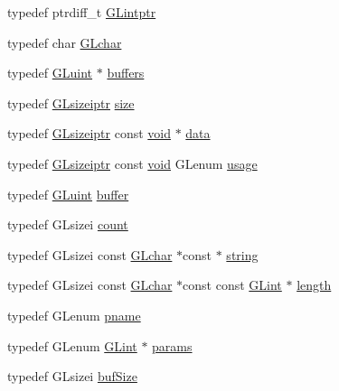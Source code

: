 \begin{DoxyCompactItemize}
\item 
typedef ptrdiff\+\_\+t \hyperlink{namespacetrimesh_a77e138abc0b5c76fc39e900b4ddc2242}{G\+Lintptr}
\item 
typedef char \hyperlink{namespacetrimesh_ae0c0512592dbcadf9b11efef0409d165}{G\+Lchar}
\item 
typedef \hyperlink{namespacetrimesh_ad2289423ef47b393854afc30451d433b}{G\+Luint} $\ast$ \hyperlink{namespacetrimesh_acc06e888c17b5866a5d0551277c1cc3e}{buffers}
\item 
typedef \hyperlink{namespacetrimesh_a81f1ae6b94117df73fad0a5577fd01a9}{G\+Lsizeiptr} \hyperlink{namespacetrimesh_a1c71e2912be63f694df9e9991bddb15e}{size}
\item 
typedef \hyperlink{namespacetrimesh_a81f1ae6b94117df73fad0a5577fd01a9}{G\+Lsizeiptr} const \hyperlink{namespacetrimesh_a784ddfd979e1c579bda795a8edfc3f43}{void} $\ast$ \hyperlink{namespacetrimesh_ad9c3b218c6c8bf976dbcd9afb8740bb8}{data}
\item 
typedef \hyperlink{namespacetrimesh_a81f1ae6b94117df73fad0a5577fd01a9}{G\+Lsizeiptr} const \hyperlink{namespacetrimesh_a784ddfd979e1c579bda795a8edfc3f43}{void} G\+Lenum \hyperlink{namespacetrimesh_a1ddaaba06600c3dc8f7557589161162f}{usage}
\item 
typedef \hyperlink{namespacetrimesh_ad2289423ef47b393854afc30451d433b}{G\+Luint} \hyperlink{namespacetrimesh_ae4f60945a9da75d2dbe2212bdfd63df1}{buffer}
\item 
typedef G\+Lsizei \hyperlink{namespacetrimesh_ac13d44425d3b59f77b5d7d2917514052}{count}
\item 
typedef G\+Lsizei const \hyperlink{namespacetrimesh_ae0c0512592dbcadf9b11efef0409d165}{G\+Lchar} $\ast$const  $\ast$ \hyperlink{namespacetrimesh_a51b4a31323874089623d4b17afabc1aa}{string}
\item 
typedef G\+Lsizei const \hyperlink{namespacetrimesh_ae0c0512592dbcadf9b11efef0409d165}{G\+Lchar} $\ast$const const \hyperlink{namespacetrimesh_aeccc290e30b317c861fb146956528187}{G\+Lint} $\ast$ \hyperlink{namespacetrimesh_ad67aebb2caf29002f1fc65745e7b790b}{length}
\item 
typedef G\+Lenum \hyperlink{namespacetrimesh_aa9a53df049d69c8296a2b988a842153b}{pname}
\item 
typedef G\+Lenum \hyperlink{namespacetrimesh_aeccc290e30b317c861fb146956528187}{G\+Lint} $\ast$ \hyperlink{namespacetrimesh_a89b05d2526a1a9c3edb62082b6e8ec17}{params}
\item 
typedef G\+Lsizei \hyperlink{namespacetrimesh_aac63c9d1cb4d07a800743471ced428fc}{buf\+Size}

\end{DoxyCompactItemize}
